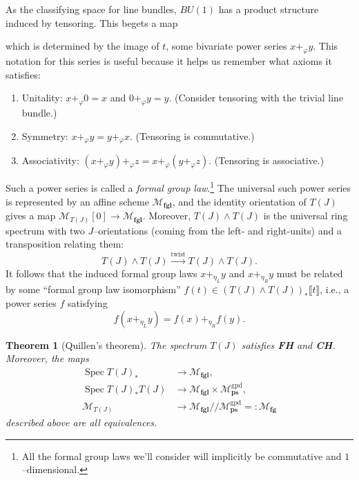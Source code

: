 \documentclass{amsart}
\newcommand{\M}{\mathcal{M}}
\newcommand{\FH}{\textbf{FH}}
\newcommand{\CH}{\textbf{CH}}
\newcommand{\<}{\langle}
\renewcommand{\>}{\rangle}
\newcommand{\sm}{\wedge}
\renewcommand{\phi}{\varphi}
\newcommand{\mmod}{/\!\!/}
\newcommand{\ps}[1]{\llbracket{#1}\rrbracket}
\newcommand{\moduli}[1]{\mathcal{M}_{\mathbf{#1}}}
\DeclareMathOperator{\Spec}{Spec}
\theoremstyle{plain}
\newtheorem*{theorem}{Theorem}
\theoremstyle{definition}
\theoremstyle{remark}
\begin{document}
As the classifying space for line bundles, $BU(1)$ has a product structure induced by tensoring.  This begets a map
\begin{center}
\end{center}
which is determined by the image of $t$, some bivariate power series $x +_\phi y$.  This notation for this series is useful because it helps us remember what axioms it satisfies:
\begin{enumerate}
\item Unitality: $x +_\phi 0 = x$ and $0 +_\phi y = y$.  (Consider tensoring with the trivial line bundle.)
\item Symmetry: $x +_\phi y = y +_\phi x$.  (Tensoring is commutative.)
\item Associativity: $(x +_\phi y) +_\phi z = x +_\phi (y +_\phi z)$.  (Tensoring is associative.)
\end{enumerate}
Such a power series is called a \textit{formal group law}.\footnote{All the formal group laws we'll consider will implicitly be commutative and $1$--dimensional.}  The universal such power series is represented by an affine scheme $\moduli{fgl}$, and the identity orientation of $T(J)$ gives a map $\M_{T(J)}[0] \to \moduli{fgl}$.  Moreover, $T(J) \sm T(J)$ is the universal ring spectrum with two $J$--orientations (coming from the left- and right-units) and a transposition relating them: \[T(J) \sm T(J) \xrightarrow{\text{twist}} T(J) \sm T(J).\]  It follows that the induced formal group laws $x +_{\eta_L} y$ and $x +_{\eta_R} y$ must be related by some ``formal group law isomorphism'' $f(t) \in (T(J) \sm T(J))_*\ps{t}$, i.e., a power series $f$ satisfying \[f(x +_{\eta_L} y) = f(x) +_{\eta_R} f(y).\]

\begin{theorem}[Quillen's theorem]
The spectrum $T(J)$ satisfies {\FH} and \CH.  Moreover, the maps
\begin{align*}
\Spec T(J)_* & \to \moduli{fgl}, \\
\Spec T(J)_* T(J) & \to \moduli{fgl} \times \moduli{ps}^{\mathrm{gpd}}, \\
\M_{T(J)} & \to \moduli{fgl} \mmod \moduli{ps}^{\mathrm{gpd}} =: \moduli{fg}
\end{align*}
described above are all equivalences.
\end{theorem}
\end{document}
